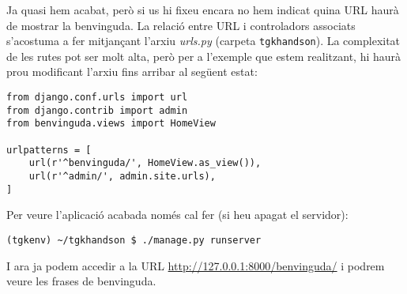\documentclass[12pt,a4paper]{article}
\begin{document}
Ja quasi hem acabat, però si us hi fixeu encara no hem indicat quina URL haurà de mostrar la benvinguda. La relació entre URL i controladors associats s'acostuma a fer mitjançant l'arxiu \emph{urls.py} (carpeta \verb+tgkhandson+). La complexitat de les rutes pot ser molt alta, però per a l'exemple que estem realitzant, hi haurà prou modificant l'arxiu fins arribar al següent estat:

\begin{lstlisting}
from django.conf.urls import url
from django.contrib import admin
from benvinguda.views import HomeView

urlpatterns = [
    url(r'^benvinguda/', HomeView.as_view()),
    url(r'^admin/', admin.site.urls),
]
\end{lstlisting}

Per veure l'aplicació acabada només cal fer (si heu apagat el servidor):
\begin{verbatim}
(tgkenv) ~/tgkhandson $ ./manage.py runserver
\end{verbatim}

I ara ja podem accedir a la URL \url{http://127.0.0.1:8000/benvinguda/} i podrem veure les frases de benvinguda.
\end{document}

